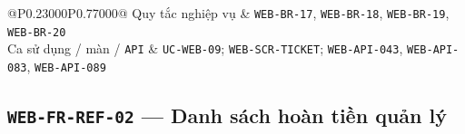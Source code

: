 \begin{longtable}{@{}P{0.23000\SRSWidth}P{0.77000\SRSWidth}@{}}
Quy tắc nghiệp vụ & \texttt{WEB-\allowbreak{}BR-\allowbreak{}17}, \texttt{WEB-\allowbreak{}BR-\allowbreak{}18}, \texttt{WEB-\allowbreak{}BR-\allowbreak{}19}, \texttt{WEB-\allowbreak{}BR-\allowbreak{}20} \\[3pt]
Ca sử dụng /\allowbreak{} màn /\allowbreak{} \texttt{API} & \texttt{UC-\allowbreak{}WEB-\allowbreak{}09}; \texttt{WEB-\allowbreak{}SCR-\allowbreak{}TICKET}; \texttt{WEB-\allowbreak{}API-\allowbreak{}043}, \texttt{WEB-\allowbreak{}API-\allowbreak{}083}, \texttt{WEB-\allowbreak{}API-\allowbreak{}089} \\[3pt]
\end{longtable}
\endgroup

\subsection{\texttt{WEB-\allowbreak{}FR-\allowbreak{}REF-\allowbreak{}02} — Danh sách hoàn tiền quản lý}
\begingroup
\fontsize{9.5}{12}\selectfont
\setlength{\SRSWidth}{\dimexpr\linewidth-2\tabcolsep\relax}
